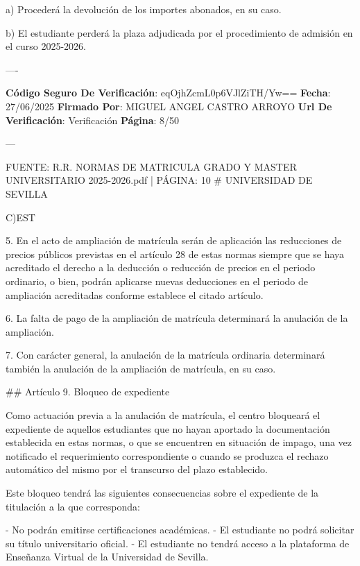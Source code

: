 \documentclass{article}
\begin{document}
\begin{itemize}
\begin{itemize}
\begin{scriptsize}
                  a) Procederá la devolución de los importes abonados, en su caso.

                  b) El estudiante perderá la plaza adjudicada por el procedimiento de admisión en el curso 2025-2026.

                  ----

                  \textbf{Código Seguro De Verificación}: eqOjhZcmL0p6VJlZiTH/Yw==
                  \textbf{Fecha}: 27/06/2025
                  \textbf{Firmado Por}: MIGUEL ANGEL CASTRO ARROYO
                  \textbf{Url De Verificación}: Verificación
                  \textbf{Página}: 8/50

                  ---

                  FUENTE: R.R. NORMAS DE MATRICULA GRADO Y MASTER UNIVERSITARIO 2025-2026.pdf | PÁGINA: 10
                  \# UNIVERSIDAD DE SEVILLA

                  C)EST

                  5. En el acto de ampliación de matrícula serán de aplicación las reducciones de precios públicos previstas en el artículo 28 de estas normas siempre que se haya acreditado el derecho a la deducción o reducción de precios en el periodo ordinario, o bien, podrán aplicarse nuevas deducciones en el periodo de ampliación acreditadas conforme establece el citado artículo.

                  6. La falta de pago de la ampliación de matrícula determinará la anulación de la ampliación.

                  7. Con carácter general, la anulación de la matrícula ordinaria determinará también la anulación de la ampliación de matrícula, en su caso.

                  \#\# Artículo 9. Bloqueo de expediente

                  Como actuación previa a la anulación de matrícula, el centro bloqueará el expediente de aquellos estudiantes que no hayan aportado la documentación establecida en estas normas, o que se encuentren en situación de impago, una vez notificado el requerimiento correspondiente o cuando se produzca el rechazo automático del mismo por el transcurso del plazo establecido.

                  Este bloqueo tendrá las siguientes consecuencias sobre el expediente de la titulación a la que corresponda:

                  - No podrán emitirse certificaciones académicas.
                  - El estudiante no podrá solicitar su título universitario oficial.
                  - El estudiante no tendrá acceso a la plataforma de Enseñanza Virtual de la Universidad de Sevilla.


\end{scriptsize}
\end{itemize}
\end{itemize}
\end{document}
